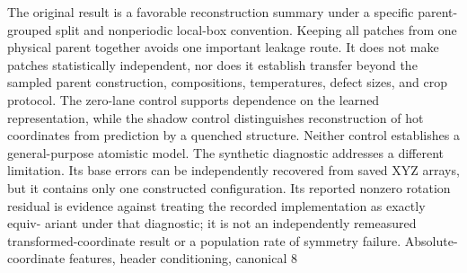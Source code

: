 \documentclass[11pt]{article}
\begin{document}
The original result is a favorable reconstruction summary under a specific parent-grouped split and
nonperiodic local-box convention. Keeping all patches from one physical parent together avoids one
important leakage route. It does not make patches statistically independent, nor does it establish
transfer beyond the sampled parent construction, compositions, temperatures, defect sizes, and
crop protocol. The zero-lane control supports dependence on the learned representation, while
the shadow control distinguishes reconstruction of hot coordinates from prediction by a quenched
structure. Neither control establishes a general-purpose atomistic model.
The synthetic diagnostic addresses a different limitation. Its base errors can be independently
recovered from saved XYZ arrays, but it contains only one constructed configuration. Its reported
nonzero rotation residual is evidence against treating the recorded implementation as exactly equiv-
ariant under that diagnostic; it is not an independently remeasured transformed-coordinate result or
a population rate of symmetry failure. Absolute-coordinate features, header conditioning, canonical
8
\end{document}
